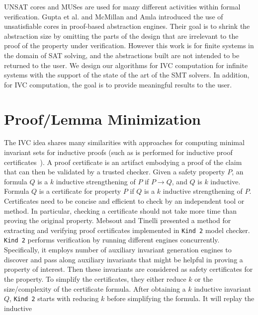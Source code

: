 UNSAT cores and MUSes are used for many different activities within
formal verification. Gupta et al. \cite{gupta2003iterative} and
McMillan and Amla \cite{mcmillan2003automatic} introduced the use of
unsatisfiable cores in proof-based abstraction engines. Their goal is
to shrink the abstraction size by omitting the parts of the design
that are irrelevant to the proof of the property under verification.
However this work is for finite systems in the domain of SAT solving,
 and the abstractions built are not intended to be returned to the user.
 We design our algorithms for IVC computation for
 infinite systems with the support of the state of the art of the SMT solvers. In addition, for IVC computation, the goal is to provide meaningful results to the user.

\section{Proof/Lemma Minimization}
The IVC idea shares many similarities with approaches for computing minimal invariant sets for inductive proofs (such as is performed for inductive proof certificates~\cite{piskac2016, Ivrii14:invariants}).
A proof certificate is an artifact embodying a proof of the
claim that can then be validated by a trusted checker.
Given a safety property $P$, an formula $Q$ is a $k$ inductive strengthening of $P$ if
$P \rightarrow Q$, and $Q$ is $k$ inductive. 
Formula $Q$ is a certificate for property $P$ if $Q$ is
a $k$ inductive strengthening of $P$.
Certificates need to be concise and efficient to check
by an independent tool or method. In particular, 
checking a certificate should not take more
time than proving the original property. Mebsout and Tinelli presented a method for extracting and verifying proof certificates \cite{piskac2016} implemented in \texttt{Kind 2} model checker. 
\texttt{Kind 2} performs verification by running different engines concurrently. Specifically, it employs number of auxiliary invariant generation engines to
discover and pass along auxiliary invariants that might be
helpful in proving a property of interest. Then these invariants are considered as
safety certificates for the property. 
To simplify the certificates, they either reduce $k$ or the size/complexity of the certificate formula.
After obtaining a $k$ inductive invariant $Q$, \texttt{Kind 2} starts with reducing $k$ before simplifying the formula. It will replay the inductive
